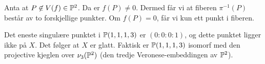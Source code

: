 \documentclass[11pt, norsk]{article}
\begin{document}
Anta at $P \not \in V(f) \in \mathbb{P}^2$. Da er $f(P) \neq 0$. Dermed får vi at fiberen $\pi^{-1}(P)$ består av to forskjellige punkter. Om $f(P)=0$, får vi kun ett punkt i fiberen.

Det eneste singulære punktet i $\mathbb{P}(1,1,1,3)$ er $(0:0:0:1)$, og dette punktet ligger ikke på $X$. Det følger at $X$ er glatt. Faktisk er $\mathbb{P}(1,1,1,3)$ isomorf med den projective kjeglen over $\nu_3(\mathbb{P}^2)$ (den tredje Veronese-embeddingen av $\mathbb{P}^2$).
\end{document}
